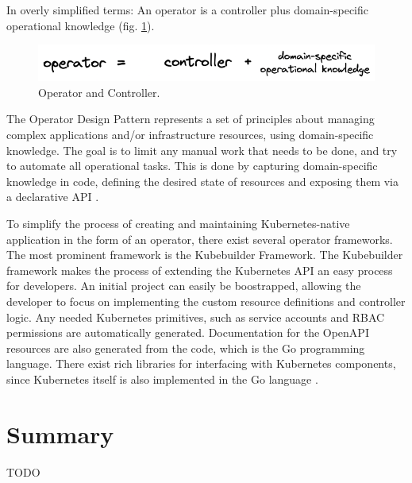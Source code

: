 In overly simplified terms:
An operator is a controller plus domain-specific operational knowledge
(fig. \ref{fig:operatorAndController}).

\begin{figure}[h]
	\centering
	\includegraphics[width=1.00\linewidth]{assets/operator-is-controller-domain-knowledge.png}
	\caption{Operator and Controller.
	}
	\label{fig:operatorAndController}	
\end{figure}

The Operator Design Pattern represents a set of principles about
managing complex applications and/or infrastructure resources,
using domain-specific knowledge.
The goal is to limit any manual work that needs to be done,
and try to automate all operational tasks.
This is done by capturing domain-specific knowledge in code,
defining the desired state of resources and exposing them
via a declarative API
\autocite{operatorWhitepaperV1}.

To simplify the process of creating and maintaining Kubernetes-native application
in the form of an operator,
there exist several operator frameworks.
The most prominent framework is the Kubebuilder Framework.
The Kubebuilder framework makes the process of extending the Kubernetes API
an easy process for developers.
An initial project can easily be boostrapped, allowing the developer to focus
on implementing the custom resource definitions and controller logic.
Any needed Kubernetes primitives, such as service accounts and RBAC permissions
are automatically generated.
Documentation for the OpenAPI resources are also generated from the code,
which is the Go programming language.
There exist rich libraries for interfacing with Kubernetes components,
since Kubernetes itself is also implemented in the Go language
\autocite{kubebuilderBookWebsite}.


\section{Summary}

TODO
































